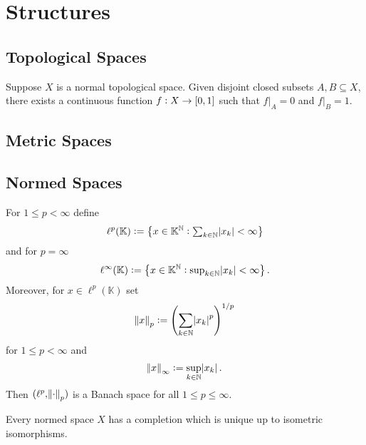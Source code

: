 \section{Structures}
\subsection{Topological Spaces}

\begin{theorem} 
	Suppose $X$ is a normal topological space. Given disjoint closed subsets $A,B \subseteq X$, there exists a continuous function $f : X \to \intcc{0,1}$ such that $f \vert_A = 0$ and $f \vert_B = 1$.
\end{theorem}

\subsection{Metric Spaces}

\subsection{Normed Spaces}

\begin{proposition}
	For $1 \leq p < \infty$ define
	\begin{equation}
		\ell^p(\mathbb{K}) := \cbr[1]{x \in \mathbb{K}^\mathbb{N} : \textstyle{\sum_{k \in \mathbb{N}}} \abs{x_k} < \infty}
	\end{equation}
	\noindent and for $p = \infty$
	\begin{equation}
		\ell^\infty(\mathbb{K}) := \cbr[1]{x \in \mathbb{K}^\mathbb{N} : \textstyle{\sup_{k \in \mathbb{N}}} \abs{x_k} < \infty}.
	\end{equation}
	Moreover, for $x \in \ell^p(\mathbb{K})$ set
	\begin{equation}
		\norm{x}_p := \del[4]{\sum_{k \in \mathbb{N}} \abs{x_k}^p}^{1/p}
	\end{equation}
	\noindent for $1 \leq p < \infty$ and
	\begin{equation}
		\norm{x}_\infty := \sup_{k \in \mathbb{N}} \abs{x_k}.
	\end{equation}
	Then $(\ell^p,\norm{\cdot}_p)$ is a Banach space for all $1 \leq p \leq \infty$.
\end{proposition}

\begin{theorem}
	Every normed space $X$ has a completion which is unique up to isometric isomorphisms.
\end{theorem}
